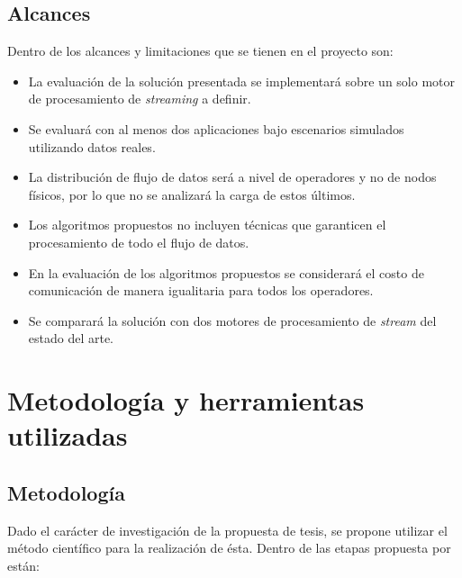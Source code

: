\subsection{Alcances}
Dentro de los alcances y limitaciones que se tienen en el proyecto son:
\begin{itemize}
	\item La evaluación de la solución presentada se implementará sobre un solo motor de procesamiento de \textsl{streaming} a definir.
	\item Se evaluará con al menos dos aplicaciones bajo escenarios simulados utilizando datos reales.
	\item La distribución de flujo de datos será a nivel de operadores y no de nodos f\'isicos, por lo que no se analizará la carga de estos \'ultimos.
	\item Los algoritmos propuestos no incluyen t\'ecnicas que garanticen el procesamiento de todo el flujo de datos.
	\item En la evaluación de los algoritmos propuestos se considerará el costo de comunicación de manera igualitaria para todos los operadores.
	\item Se comparará la solución con dos motores de procesamiento de \textsl{stream} del estado del arte.
\end{itemize}


\section{Metodología y herramientas utilizadas}
\label{intro:metodologia}

\subsection{Metodología}
Dado el carácter de investigación de la propuesta de tesis, se propone utilizar el método científico para la realización de ésta. Dentro de las etapas propuesta por \cite{hernandez2010metodologia} están:

